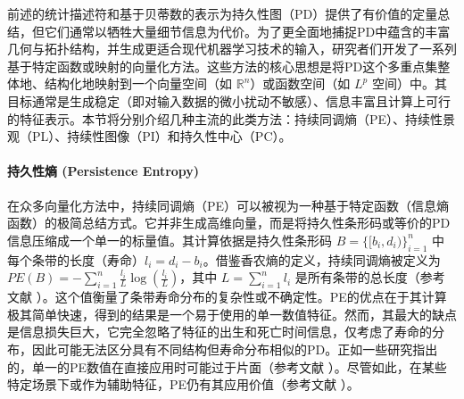             前述的统计描述符和基于贝蒂数的表示为持久性图（PD）提供了有价值的定量总结，但它们通常以牺牲大量细节信息为代价。为了更全面地捕捉PD中蕴含的丰富几何与拓扑结构，并生成更适合现代机器学习技术的输入，研究者们开发了一系列基于特定函数或映射的向量化方法。这些方法的核心思想是将PD这个多重点集整体地、结构化地映射到一个向量空间（如 $\mathbb{R}^n$）或函数空间（如 $L^p$ 空间）中。其目标通常是生成稳定（即对输入数据的微小扰动不敏感）、信息丰富且计算上可行的特征表示。本节将分别介绍几种主流的此类方法：持续同调熵（PE）、持续性景观（PL）、持续性图像（PI）和持久性中心（PC）。

            \paragraph{持久性熵 (Persistence Entropy)}
            \label{sec:feat_pe}
            在众多向量化方法中，持续同调熵（PE）可以被视为一种基于特定函数（信息熵函数）的极简总结方式。它并非生成高维向量，而是将持久性条形码或等价的PD信息压缩成一个单一的标量值。其计算依据是持久性条形码 $B = \{[b_i, d_i)\}_{i=1}^n$ 中每个条带的长度（寿命）$l_i = d_i - b_i$。借鉴香农熵的定义，持续同调熵被定义为 $PE(B) = -\sum_{i=1}^{n} \frac{l_i}{L} \log(\frac{l_i}{L})$，其中 $L = \sum_{i=1}^{n} l_i$ 是所有条带的总长度（参考文献 ）。这个值衡量了条带寿命分布的复杂性或不确定性。PE的优点在于其计算极其简单快速，得到的结果是一个易于使用的单一数值特征。然而，其最大的缺点是信息损失巨大，它完全忽略了特征的出生和死亡时间信息，仅考虑了寿命的分布，因此可能无法区分具有不同结构但寿命分布相似的PD。正如一些研究指出的，单一的PE数值在直接应用时可能过于片面（参考文献 ）。尽管如此，在某些特定场景下或作为辅助特征，PE仍有其应用价值（参考文献 ）。

